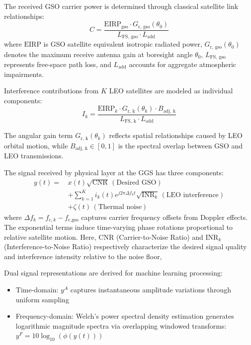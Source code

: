 \documentclass[conference]{IEEEtran}
\begin{document}
The received GSO carrier power is determined through classical satellite link relationships:
\begin{equation}
    C = \frac{\text{EIRP}_{\text{gso}} \cdot G_{\text{r, gso}}(\theta_0)}{L_{\text{FS, gso}} \cdot L_{\text{add}}}
    \label{eq:carrier_power}
\end{equation}
where $\text{EIRP}$ is GSO satellite equivalent isotropic radiated power, $G_{\text{r, gso}}(\theta_0)$ denotes the maximum receive antenna gain at boresight angle $\theta_0$, $L_{\text{FS, gso}}$ represents free-space path loss, and $L_{\text{add}}$ accounts for aggregate atmospheric impairments.

Interference contributions from $K$ LEO satellites are modeled as individual components:
\begin{equation}
    I_k = \frac{\text{EIRP}_k \cdot G_{\text{r, k}}(\theta_k) \cdot B_{\text{adj, k}}}{L_{\text{FS, k}} \cdot L_{\text{add}}}
    \label{eq:interference_power}
\end{equation}

The angular gain term $G_{\text{r, k}}(\theta_k)$ reflects spatial relationships caused by LEO orbital motion, while $B_{\text{adj, k}} \in [0,1]$ is the spectral overlap between GSO and LEO transmissions.

The signal received by physical layer at the GGS has three components:
\begin{align}
    y(t) =\, & x(t)\sqrt{\text{CNR}}\, (\text{Desired GSO}) \nonumber                                                 \\[0.5em]
             & + \sum_{k=1}^{K} i_k(t)e^{j2\pi \Delta f_k t}\sqrt{\text{INR}_k}\, (\text{LEO interference}) \nonumber \\[0.5em]
             & + \zeta(t)\, (\text{Thermal noise})
\end{align}
where $\Delta f_k = f_{\text{c},k} - f_{\text{c,gso}}$ captures carrier frequency offsets from Doppler effects. The exponential terms induce time-varying phase rotations proportional to relative satellite motion. Here, $\text{CNR}$ (Carrier-to-Noise Ratio) and $\text{INR}_k$ (Interference-to-Noise Ratio) respectively characterize the desired signal quality and interference intensity relative to the noise floor,

Dual signal representations are derived for machine learning processing:
\begin{itemize}
    \item Time-domain: $y^A$ captures instantaneous amplitude variations through uniform sampling
    \item Frequency-domain: Welch's power spectral density estimation generates logarithmic magnitude spectra via overlapping windowed transforms: $y^F = 10\log_{10}(\phi(y(t)))$
\end{itemize}
\end{document}
